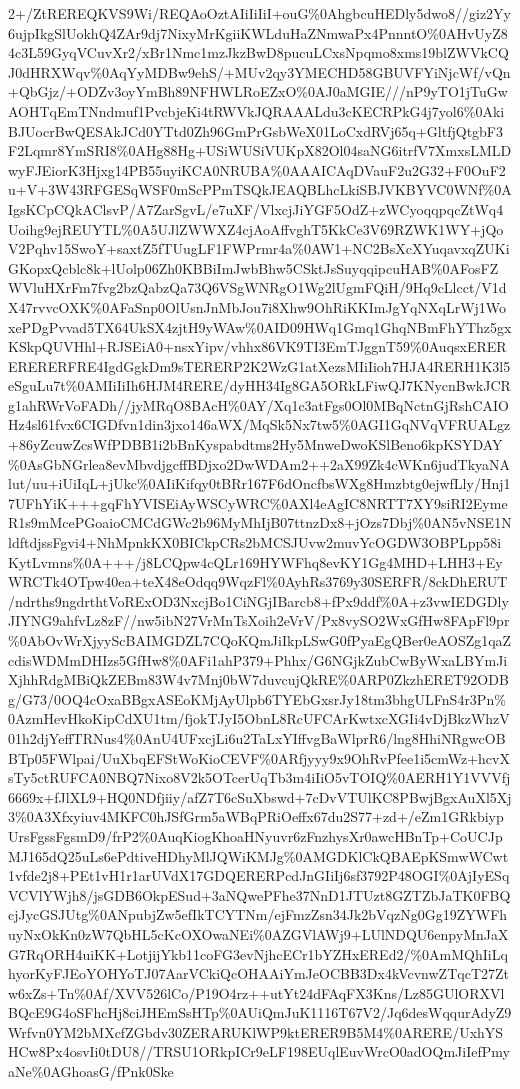 \documentclass[]{article}
\begin{document}
2+/ZtREREQKVS9Wi/REQAoOztAIiIiIiI+ouG\%0AhgbcuHEDly5dwo8//giz2Yy6ujpIkgSlUokhQ4ZAr9dj7NixyMrKgiiKWLduHaZNmwaPx4PnnntO\%0AHvUyZ84c3L59GyqVCuvXr2/xBr1Nmc1mzJkzBwD8pucuLCxsNpqmo8xms19blZWVkCQJ0dHRXWqv\%0AqYyMDBw9ehS/+MUv2qy3YMECHD58GBUVFYiNjcWf/vQn+QbGjz/+ODZv3oyYmBh89NFHWLRoEZxO\%0AJ0aMGIE///nP9yTO1jTuGwAOHTqEmTNndmuf1PvcbjeKi4tRWVkJQRAAALdu3cKECRPkG4j7yol6\%0AkiBJUocrBwQESAkJCd0YTtd0Zh96GmPrGsbWeX01LoCxdRVj65q+GltfjQtgbF3F2Lqmr8YmSRI8\%0AHg88Hg+USiWUSiVUKpX82Ol04saNG6itrfV7XmxsLMLDwyFJEiorK3Hjxg14PB55uyiKCA0NRUBA\%0AAAICAqDVauF2u2G32+F0OuF2u+V+3W43RFGESqWSF0mScPPmTSQkJEAQBLhcLkiSBJVKBYVC0WNf\%0AIgsKCpCQkAClsvP/A7ZarSgvL/e7uXF/VlxcjJiYGF5OdZ+zWCyoqqpqcZtWq4Uoihg9ejREUYTL\%0A5UJlZWWXZ4cjAoAffvghT5KkCe3V69RZWK1WY+jQoV2Pqhv15SwoY+saxtZ5fTUugLF1FWPrmr4a\%0AW1+NC2BsXcXYuqavxqZUKiGKopxQcblc8k+lUolp06Zh0KBBiImJwbBhw5CSktJsSuyqqipcuHAB\%0AFosFZWVluHXrFm7fvg2bzQabzQa73Q6VSgWNRgO1Wg2lUgmFQiH/9Hq9cLlcct/V1dX47rvvcOXK\%0AFaSnp0OlUsnJnMbJou7i8Xhw9OhRiKKImJgYqNXqLrWj1WoxePDgPvvad5TX64UkSX4zjtH9yWAw\%0AID09HWq1Gmq1GhqNBmFhYThz5gxKSkpQUVHhl+RJSEiA0+nsxYipv/vhhx86VK9TI3EmTJggnT59\%0AuqsxERERERERERFRE4IgdGgkDm9sTERERP2K2WzG1atXezsMIiIioh7HJA4RERH1K3l5eSguLu7t\%0AMIiIiIh6HJM4RERE/dyHH34Ig8GA5ORkLFiwQJ7KNycnBwkJCRg1ahRWrVoFADh//jyMRqO8BAcH\%0AY/Xq1c3atFgs0Ol0MBqNctnGjRshCAIOHz4sl61fvx6CIGDfvn1din3jxo146aWX/MqSk5Nx7tw5\%0AGI1GqNVqVFRUALgz+86yZcuwZcsWfPDBB1i2bBnKyspabdtms2Hy5MnweDwoKSlBeno6kpKSYDAY\%0AsGbNGrlea8evMbvdjgcffBDjxo2DwWDAm2++2aX99Zk4cWKn6judTkyaNAlut/uu+iUiIqL+jUkc\%0AIiKifqy0tBRr167F6dOncfbsWXg8Hmzbtg0ejwfLly/Hnj17UFhYiK+++gqFhYVISEiAyWSCyWRC\%0AXl4eAgIC8NRTT7XY9siRI2EymeR1s9mMcePGoaioCMCdGWc2b96MyMhIjB07ttnzDx8+jOzs7Dbj\%0AN5vNSE1NldftdjssFgvi4+NhMpnkKX0BICkpCRs2bMCSJUvw2muvYcOGDW3OBPLpp58iKytLvmns\%0A+++/j8LCQpw4cQLr169HYWFhq8evKY1Gg4MHD+LHH3+EyWRCTk4OTpw40ea+teX48eOdqq9WqzFl\%0AyhRs3769y30SERFR/8ckDhERUT/ndrths9ngdrthtVoRExOD3NxcjBo1CiNGjIBarcb8+fPx9ddf\%0A+z3vwIEDGDlyJIYNG9ahfvLz8zF//nw5ibN27VrMnTsXoih2eVrV/Px8vySO2WxGfHw8FApFl9pr\%0AbOvWrXjyyScBAIMGDZL7CQoKQmJiIkpLSwG0fPyaEgQBer0eAOSZg1qaZcdisWDMmDHIzs5GfHw8\%0AFi1ahP379+Phhx/G6NGjkZubCwByWxaLBYmJiXjhhRdgMBiQkZEBm83W4v7Mnj0bW7duvcujQkRE\%0ARP0ZkzhERET92ODBg/G73/0OQ4cOxaBBgxASEoKMjAyUlpb6TYEbGxsrJy18tm3bhgULFnS4r3Pn\%0AzmHevHkoKipCdXU1tm/fjokTJyI5ObnL8RcUFCArKwtxcXGIi4vDjBkzWhzV01h2djYeffTRNus4\%0AnU4UFxcjLi6u2TaLxYIffvgBaWlprR6/lng8HhiNRgwcOBBTp05FWlpai/UuXbqEFStWoKioCEVF\%0ARfjyyy9x9OhRvPfee1i5cmWz+hcvXsTy5ctRUFCA0NBQ7Nixo8V2k5OTcerUqTb3m4iIiO5vTOIQ\%0AERH1Y1VVVfj6669x+fJlXL9+HQ0NDfjiiy/afZ7T6cSuXbswd+7cDvVTUlKC8PBwjBgxAuXl5Xj3\%0A3Xfxyiuv4MKFC0hJSfGrm5aWBqPRiOeffx67du2S77+zd+/eZm1GRkbiypUrsFgssFgsmD9/frP2\%0AuqKiogKhoaHNyuvr6zFnzhysXr0awcHBnTp+CoUCJpMJ165dQ25uLs6ePdtiveHDhyMlJQWiKMJg\%0AMGDKlCkQBAEpKSmwWCwt1vfde2j8+PEt1vH1r1arUVdX17GDQERERPcdJnGIiIj6sf3792P48OGI\%0AjIyESqVCVlYWjh8/jsGDB6OkpESud+3aNQwePFhe37NnD1JTUzt8GZTZbJaTK0FBQcjJycGSJUtg\%0ANpubjZw5efIkTCYTNm/ejFmzZsn34Jk2bVqzNg0Gg19ZYWFhuyNxOkKn0zW7QbHL5cKcOXOwaNEi\%0AZGVlAWj9+LUlNDQU6enpyMnJaXG7RqORH4uiKK+LotjijYkb11coFG3evNjhcECr1bYZHxEREd2/\%0AmMQhIiLqhyorKyFJEoYOHYoTJ07AarVCkiQcOHAAiYmJeOCBB3Dx4kVcvnwZTqcT27Ztw6xZs+Tn\%0Af/XVV526lCo/P19O4rz++utYt24dFAqFX3Kns/Lz85GUlORXVlBQcE9G4oSFhcHj8ciJHEmSsHTp\%0AUiQmJuK1116T67V2/Jq6desWqqurAdyZ9Wrfvn0YM2bMXcfZGbdv30ZERARUKlWP9ktERER9B5M4\%0ARERE/UxhYSHCw8Px4osvIi0tDU8//TRSU1ORkpICr9eLF198EUqlEuvWrcO0adOQmJiIefPmyaNe\%0AGhoasG/fPnk0Ske
\end{document}
